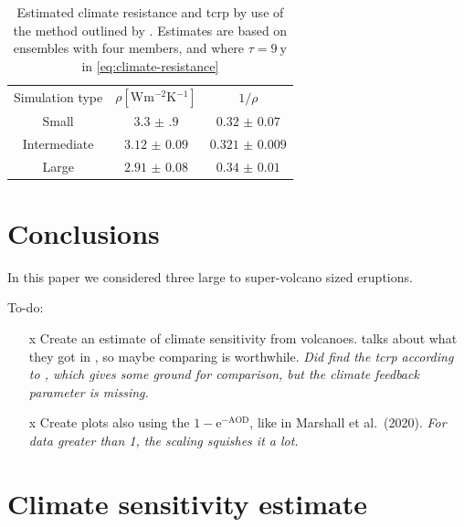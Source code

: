\documentclass{ametsocV5}
\begin{document}
\begin{table}
  \centering
  \caption{Estimated climate resistance and \ac{tcrp} by use of the method outlined by
    \citet{merlis2014}. Estimates are based on ensembles with four members, and where
    \(\tau =\SI{9}{\mathrm{y}}\) in \cref{eq:climate-resistance}}%
  \label{tab:trcp}
  \begin{tabular}{ccc}
    Simulation type & \(\rho [\si{\watt\metre^{-2}\kelvin^{-1}}]\) & \(1/\rho\)         \\
    Small           & \(\num{3.3(9)}\)                             & \(\num{0.32(7)}\)  \\
    Intermediate    & \(\num{3.12(9)}\)                            & \(\num{0.321(9)}\) \\
    Large           & \(\num{2.91(8)}\)                            & \(\num{0.34(1)}\)  \\
  \end{tabular}
\end{table}

\section{Conclusions}


In this paper we considered three large to super-volcano sized eruptions.

\clearpage

To-do:

\begin{itemize}
  \item[\lbrack{}x\rbrack{}] Create an estimate of climate sensitivity from volcanoes.
    \citet{gregory2016} talks about what they got in \citet{jones2005}, so maybe comparing
    is worthwhile. \emph{Did find the \ac{tcrp} according to \citet{merlis2014}, which gives
      some ground for comparison, but the climate feedback parameter is missing.}
  \item[\lbrack{}x\rbrack{}] Create plots also using the \(1-\mathrm{e}^{-\mathrm{AOD}}\), like
    in Marshall et al.\ (2020). \emph{For data greater than 1, the scaling squishes it a
      lot.}
\end{itemize}

\section*{Climate sensitivity estimate}
\end{document}
